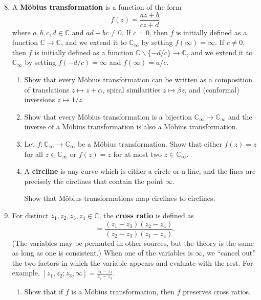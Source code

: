 \begin{enumerate}\setcounter{enumi}{7}
\item A \textbf{M\"{o}bius transformation} is a function of the form
\begin{equation*}
f(z) = \frac{az + b}{cz + d}
\end{equation*}
where $a,b,c,d\in\mathbb{C}$ and $ad - bc\neq 0$. If $c = 0$, then $f$ is initially defined as a function $\mathbb{C}\to\mathbb{C}$, and we extend it to $\mathbb{C}_{\infty}$ by setting $f(\infty) = \infty$. If $c\neq 0$, then $f$ is initially defined as a function $\mathbb{C}\backslash\{-d/c\}\to\mathbb{C}$, and we extend it to $\mathbb{C}_{\infty}$ by setting $f(-d/c) = \infty$ and $f(\infty) = a/c$.
\begin{enumerate}
\item Show that every M\"{o}bius transformation can be written as a composition of translations $z\mapsto z + \alpha$, spiral similarities $z\mapsto\beta z$, and (conformal) inversions $z\mapsto 1/z$.
\item Show that every M\"{o}bius transformation is a bijection $\mathbb{C}_{\infty}\to\mathbb{C}_{\infty}$ and the inverse of a M\"{o}bius transformation is also a M\"{o}bius transformation.
\item Let $f:\mathbb{C}_{\infty}\to\mathbb{C}_{\infty}$ be a M\"{o}bius transformation. Show that either $f(z) = z$ for all $z\in\mathbb{C}_{\infty}$ or $f(z) = z$ for at most two $z\in\mathbb{C}_{\infty}$.
\item A \textbf{circline} is any curve which is either a circle or a line, and the lines are precisely the circlines that contain the point $\infty$.\par
Show that M\"{o}bius transformations map circlines to circlines.
\end{enumerate}
\item For distinct $z_1,z_2,z_3,z_4\in\mathbb{C}$, the \textbf{cross ratio} is defined as
\begin{equation*}
[z_1,z_2;z_3,z_4] = \frac{(z_1 - z_3)(z_2 - z_4)}{(z_2 - z_3)(z_1 - z_4)}.
\end{equation*}
(The variables may be permuted in other sources, but the theory is the same as long as one is consistent.) When one of the variables is $\infty$, we ``cancel out'' the two factors in which the variable appears and evaluate with the rest. For example, $[z_1,z_2;z_3,\infty] = \frac{z_1 - z_3}{z_2 - z_3}$.
\begin{enumerate}
\item Show that if $f$ is a M\"{o}bius transformation, then $f$ preserves cross ratios.

\end{enumerate}
\end{enumerate}
